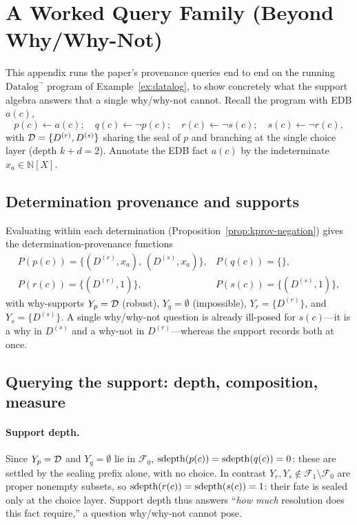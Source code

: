 \section{A Worked Query Family (Beyond Why/Why-Not)}
\label{app:worked-queries}

This appendix runs the paper's provenance queries end to end on the running
$\mbox{Datalog}^\neg$ program of Example~\ref{ex:datalog}, to show concretely
what the support algebra answers that a single why/why-not cannot. Recall the
program with EDB $a(c)$,
\[
  p(c) \leftarrow a(c); \quad
  q(c) \leftarrow \neg p(c); \quad
  r(c) \leftarrow \neg s(c); \quad
  s(c) \leftarrow \neg r(c),
\]
with $\mathcal{D} = \{D^{(r)}, D^{(s)}\}$ sharing the seal of $p$ and branching at the
single choice layer (depth $k{+}d = 2$). Annotate the EDB fact $a(c)$ by the
indeterminate $x_a \in \mathbb{N}[X]$.

\subsection{Determination provenance and supports}

Evaluating within each determination (Proposition~\ref{prop:kprov-negation})
gives the determination-provenance functions
\[
  \begin{array}{ll}
    P(p(c)) = \{(D^{(r)}, x_a),\,(D^{(s)}, x_a)\}, &
    P(q(c)) = \{\}, \\[2pt]
    P(r(c)) = \{(D^{(r)}, 1)\}, &
    P(s(c)) = \{(D^{(s)}, 1)\},
  \end{array}
\]
with why-supports $Y_{p} = \mathcal{D}$ (robust), $Y_{q} = \emptyset$ (impossible),
$Y_{r} = \{D^{(r)}\}$, and $Y_{s} = \{D^{(s)}\}$. A single why/why-not question
is already ill-posed for $s(c)$---it is a why in $D^{(s)}$ and a why-not in
$D^{(r)}$---whereas the support records both at once.

\subsection{Querying the support: depth, composition, measure}

\paragraph{Support depth.}
Since $Y_p = \mathcal{D}$ and $Y_q = \emptyset$ lie in $\mathcal{F}_0$,
$\operatorname{sdepth}(p(c)) = \operatorname{sdepth}(q(c)) = 0$: these are settled by the sealing prefix
alone, with no choice. In contrast $Y_r, Y_s \notin \mathcal{F}_1 \setminus
\mathcal{F}_0$ are proper nonempty subsets, so $\operatorname{sdepth}(r(c)) = \operatorname{sdepth}(s(c)) =
1$: their fate is sealed only at the choice layer. Support depth thus answers
``\emph{how much} resolution does this fact require,'' a question why/why-not
cannot pose.

